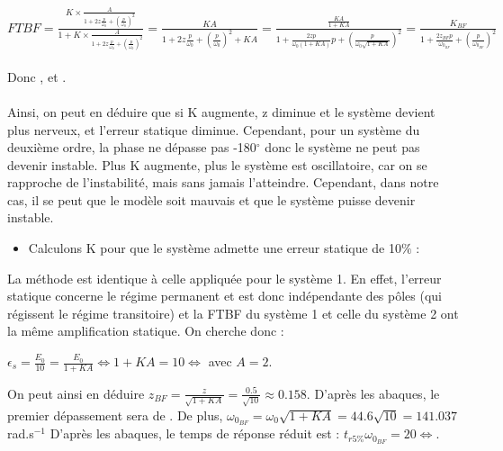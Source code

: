 \documentclass[12pt]{article}
\begin{document}
\large $FTBF = \frac{K\times \frac{A}{1 + 2z\frac{p}{\omega_0} + (\frac{p}{\omega_0})^2}}{1 + K\times \frac{A}{1 + 2z\frac{p}{\omega_0} + (\frac{p}{\omega_0})^2}} = \frac{KA}{1 + 2z\frac{p}{\omega_0} + (\frac{p}{\omega_0})^2 + KA} = \frac{\frac{KA}{1 + KA}}{1 + \frac{2zp}{\omega_0(1+KA)}p + (\frac{p}{\omega_0\sqrt{1+KA}})^2} = \frac{K_{BF}}{1 + \frac{2z_{BF}p}{\omega_{0_{BF}}}+ (\frac{p}{\omega_{0_{BF}}})^2}$
\\\\\normalsize Donc \large {},  \normalsize et \large {}.
\\\\ \normalsize Ainsi, on peut en déduire que si K augmente, z diminue et le système devient plus nerveux, et l'erreur statique diminue. Cependant, pour un système du deuxième ordre, la phase ne dépasse pas -180$^{\circ}$ donc le système ne peut pas devenir instable. Plus K augmente, plus le système est oscillatoire, car on se rapproche de l'instabilité, mais sans jamais l'atteindre. Cependant, dans notre cas, il se peut que le modèle soit mauvais et que le système puisse devenir instable.

\begin{itemize}
    \item Calculons K pour que le système admette une erreur statique de 10$\%$ : 
\end{itemize}
La méthode est identique à celle appliquée pour le système 1. En effet, l'erreur statique concerne le régime permanent et est donc indépendante des pôles (qui régissent le régime transitoire) et la FTBF du système 1 et celle du système 2 ont la même amplification statique.
On cherche donc : 
\begin{center}
    $\epsilon_s = \frac{E_0}{10} = \frac{E_0}{1 + KA} \Leftrightarrow 1 + KA = 10 \Leftrightarrow$ avec $A = 2$.
\end{center}
On peut ainsi en déduire $z_{BF} = \frac{z}{\sqrt{1 + KA}} = \frac{0.5}{\sqrt{10}} \approx 0.158$. D'après les abaques, le premier dépassement sera de .
De plus, $\omega_{0_{BF}} = \omega_0\sqrt{1 + KA} = 44.6\sqrt{10} = 141.037$ rad.s$^{-1}$
D'après les abaques, le temps de réponse réduit est : $t_{r5\%}\omega_{0_{BF}} = 20 \Leftrightarrow $.
\end{document}

